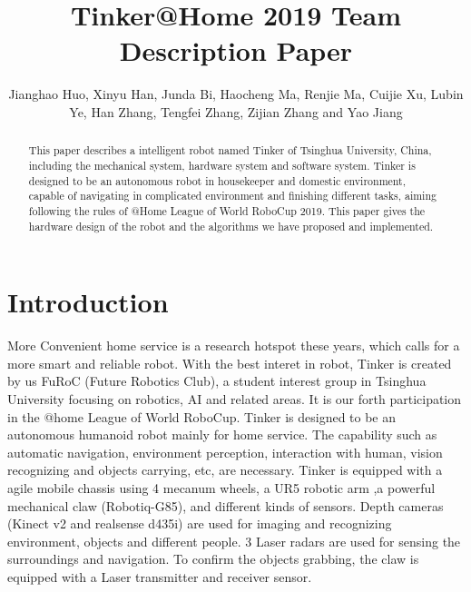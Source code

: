\documentclass[runningheads,a4paper]{llncs}
\begin{document}
	
\title{Tinker@Home 2019 Team Description Paper}
\author{Jianghao Huo, Xinyu Han, Junda Bi, Haocheng Ma, Renjie Ma, Cuijie Xu, Lubin Ye, Han Zhang, Tengfei Zhang, Zijian Zhang and Yao Jiang}
\maketitle

\begin{abstract}
This paper describes a intelligent robot named Tinker of Tsinghua University, China, including the mechanical system, hardware system and software system. Tinker is designed to be an autonomous robot in housekeeper and domestic environment, capable of navigating in complicated environment and finishing different tasks, aiming following the rules of @Home League of World RoboCup 2019. This paper gives the hardware design of the robot and the algorithms we have proposed and implemented.
\end{abstract}

\section{Introduction}
More Convenient home service is a research hotspot these years, which calls for a more smart and reliable robot. With the best interet in robot, Tinker is created by us FuRoC (Future Robotics Club), a student interest group in Tsinghua University focusing on robotics, AI and related areas. It is our forth participation in the @home League of World RoboCup. Tinker is designed to be an autonomous humanoid robot mainly for home service. The capability such as automatic navigation, environment perception, interaction with human, vision recognizing and objects carrying, etc, are necessary. Tinker is equipped with a agile mobile chassis using 4 mecanum wheels, a UR5 robotic arm ,a powerful  mechanical claw (Robotiq-G85), and different kinds of sensors. Depth cameras (Kinect v2 and realsense d435i) are used for imaging and recognizing environment, objects and different people. 3 Laser radars  are used for sensing the surroundings and navigation. To confirm the objects grabbing, the claw is equipped with a Laser transmitter and receiver sensor.
\end{document}
